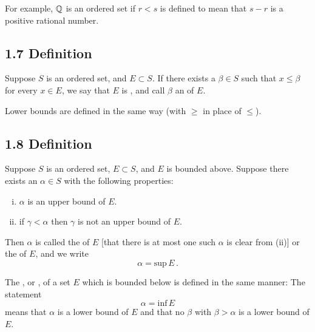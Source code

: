 For example, $\mathbb{Q}$ is an ordered set if $r < s$ is defined to mean that $s - r$ is a positive rational number.

\subsection*{1.7 Definition}
Suppose $S$ is an ordered set, and $E \subset S$. If there exists a $\beta \in S$ such that $x \leq \beta$ for every $x \in E$, we say that $E$ is , and call $\beta$ an  of $E$.

Lower bounds are defined in the same way (with $\geq$ in place of $\leq$).  

\subsection*{1.8 Definition}
Suppose $S$ is an ordered set, $E \subset S$, and $E$ is bounded above. Suppose there exists an $\alpha \in S$ with the following properties:
\begin{enumerate}[(i)]
\item $\alpha$ is an upper bound of $E$. 
\item if $\gamma < \alpha$ then $\gamma$ is not an upper bound of $E$. 
\end{enumerate}

Then $\alpha$ is called the  of $E$ [that there is at most one  such $\alpha$ is clear from (ii)] or the  of $E$, and we write $$\alpha = \text{sup}\,E\,.$$

The , or , of a set $E$ which is bounded below is defined in the same manner: The statement $$\alpha = \text{inf}\,E$$
means that $\alpha$ is a lower bound of $E$ and that no $\beta$ with $\beta > \alpha$ is a lower bound of $E$. 
 
